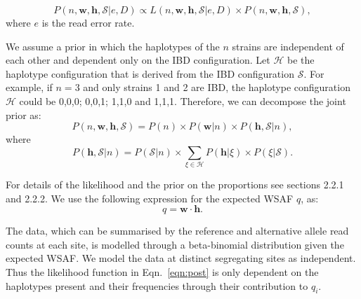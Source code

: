 \documentclass{article}
\begin{document}
\begin{equation}
P(n, \mathbf{w}, \mathbf{h}, \mathcal{S}| e, D) \propto L(n, \mathbf{w}, \mathbf{h}, \mathcal{S} | e, D) \times P(n, \mathbf{w}, \mathbf{h}, \mathcal{S}), \label{eqn:post}
\end{equation}
where $e$ is the read error rate.

\noindent We assume a prior in which the haplotypes of the $n$ strains are independent of each other and dependent only on the IBD configuration. Let $\mathcal{H}$ be the haplotype configuration that is derived from the IBD configuration $\mathcal{S}$. For example, if $n=3$ and only strains 1 and 2 are IBD, the haplotype configuration $\mathcal{H}$ could be 0,0,0; 0,0,1; 1,1,0 and 1,1,1. Therefore, we can decompose the joint prior as:
\begin{equation}
P(n, \mathbf{w}, \mathbf{h}, \mathcal{S}) = P(n) \times P(\mathbf{w}|n) \times P(\mathbf{h} , \mathcal{S}|n),
\end{equation}
where
\begin{equation}
P(\mathbf{h}, \mathcal{S}|n) = P(\mathcal{S}|n) \times \sum_{\xi \in \mathcal{H}} P(\mathbf{h} | \xi) \times P(\xi|\mathcal{S}).
\label{eqn:}
\end{equation}


\noindent For details of the likelihood and the prior on the proportions see \citet{Zhu2017} sections 2.2.1 and 2.2.2. We use the following expression for the expected WSAF $q$, as:
\begin{equation}
q = \mathbf{w}\cdot\mathbf{h}.\label{eqn:qij_full_sum}
\end{equation}



\noindent The data, which can be summarised by the reference and alternative allele read counts at each site, is modelled through a beta-binomial distribution given the expected WSAF.  We model the data at distinct segregating sites as independent.  Thus the likelihood function  in Eqn.~\eqref{eqn:post} is only dependent on the haplotypes present and their frequencies through their contribution to $q_{i}$.

\end{document}
